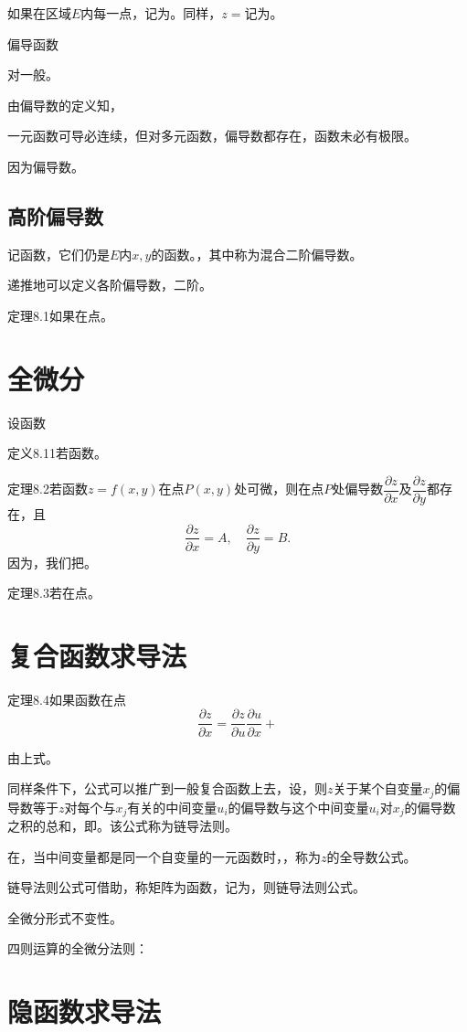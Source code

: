 如果在区域$E$内每一点，记为。同样，$z=$记为。

\noindent 偏导函数

对一般。

由偏导数的定义知，

一元函数可导必连续，但对多元函数，偏导数都存在，函数未必有极限。

因为偏导数。

\subsection{高阶偏导数}

记函数，它们仍是$E$内$x,y$的函数。，其中称为混合二阶偏导数。

递推地可以定义各阶偏导数，二阶。

定理8.1\quad 如果在点。

\section{全微分}

设函数

定义8.11\quad 若函数。

定理8.2\quad 若函数$z=f(x,y)$在点$P(x,y)$处可微，则在点$P$处偏导数$\dfrac{\partial z}{\partial x}$及$\dfrac{\partial z}{\partial y}$都存在，且
\[
\frac{\partial z}{\partial x}=A,\quad \frac{\partial z}{\partial y}=B.
\]
因为，我们把。

定理8.3\quad 若在点。

\section{复合函数求导法}

定理8.4\quad 如果函数在点
\[
\frac{\partial z}{\partial x}=\frac{\partial z}{\partial u}\frac{\partial u}{\partial x}+
\]

由上式。

同样条件下，公式可以推广到一般复合函数上去，设，则$z$关于某个自变量$x_j$的偏导数等于$z$对每个与$x_j$有关的中间变量$u_i$的偏导数与这个中间变量$u_i$对$x_j$的偏导数之积的总和，即。该公式称为链导法则。

在，当中间变量都是同一个自变量的一元函数时，，称为$z$的全导数公式。

链导法则公式可借助，称矩阵为函数，记为，则链导法则公式。

\noindent 全微分形式不变性。

\noindent 四则运算的全微分法则：

\section{隐函数求导法}
